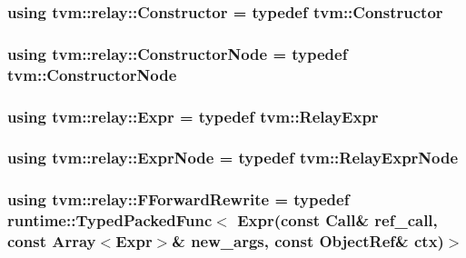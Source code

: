 \subsubsection[{\texorpdfstring{Constructor}{Constructor}}]{\setlength{\rightskip}{0pt plus 5cm}using {\bf tvm\+::relay\+::\+Constructor} = typedef {\bf tvm\+::\+Constructor}}\hypertarget{namespacetvm_1_1relay_aec85bf097deda59bd22e88475c9165e9}{}\label{namespacetvm_1_1relay_aec85bf097deda59bd22e88475c9165e9}
\subsubsection[{\texorpdfstring{Constructor\+Node}{ConstructorNode}}]{\setlength{\rightskip}{0pt plus 5cm}using {\bf tvm\+::relay\+::\+Constructor\+Node} = typedef {\bf tvm\+::\+Constructor\+Node}}\hypertarget{namespacetvm_1_1relay_a6b95f70a9b44cc1c96593201594d1345}{}\label{namespacetvm_1_1relay_a6b95f70a9b44cc1c96593201594d1345}
\subsubsection[{\texorpdfstring{Expr}{Expr}}]{\setlength{\rightskip}{0pt plus 5cm}using {\bf tvm\+::relay\+::\+Expr} = typedef {\bf tvm\+::\+Relay\+Expr}}\hypertarget{namespacetvm_1_1relay_a5b84e3790f89bb3fad5c7911eeb99531}{}\label{namespacetvm_1_1relay_a5b84e3790f89bb3fad5c7911eeb99531}
\subsubsection[{\texorpdfstring{Expr\+Node}{ExprNode}}]{\setlength{\rightskip}{0pt plus 5cm}using {\bf tvm\+::relay\+::\+Expr\+Node} = typedef {\bf tvm\+::\+Relay\+Expr\+Node}}\hypertarget{namespacetvm_1_1relay_a387f18e050d016c52ea6c4781e7cff6c}{}\label{namespacetvm_1_1relay_a387f18e050d016c52ea6c4781e7cff6c}
\subsubsection[{\texorpdfstring{F\+Forward\+Rewrite}{FForwardRewrite}}]{\setlength{\rightskip}{0pt plus 5cm}using {\bf tvm\+::relay\+::\+F\+Forward\+Rewrite} = typedef {\bf runtime\+::\+Typed\+Packed\+Func}$<$ {\bf Expr}(const {\bf Call}\& ref\+\_\+call, const {\bf Array}$<${\bf Expr}$>$\& new\+\_\+args, const Object\+Ref\& ctx)$>$}\hypertarget{namespacetvm_1_1relay_aa04117f6f0a173924ff2f6d080c9265c}{}\label{namespacetvm_1_1relay_aa04117f6f0a173924ff2f6d080c9265c}


